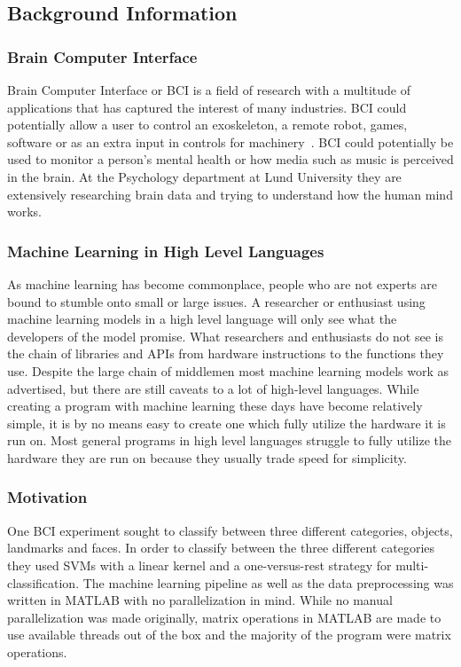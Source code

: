 \documentclass[12pt, a4paper]{article}
\begin{document}
\subsection{Background Information}

\subsubsection{Brain Computer Interface}

Brain Computer Interface or BCI is a field of research with a multitude of applications that has captured the interest of many industries.
BCI could potentially allow a user to control an exoskeleton, a remote robot, games, software or as an extra input in controls for machinery~\cite{10.3389/fnins.2010.00198}.
BCI could potentially be used to monitor a person's mental health or how media such as music is perceived in the brain.
At the Psychology department at Lund University they are extensively researching brain data and trying to understand how the human mind works.

\subsubsection{Machine Learning in High Level Languages}

As machine learning has become commonplace, people who are not experts are bound to stumble onto small or large issues.
A researcher or enthusiast using machine learning models in a high level language will only see what the developers of the model promise.
What researchers and enthusiasts do not see is the chain of libraries and APIs from hardware instructions to the functions they use.
Despite the large chain of middlemen most machine learning models work as advertised, but there are still caveats to a lot of high-level languages. 
While creating a program with machine learning these days have become relatively simple, it is by no means easy to create one which fully utilize the hardware it is run on.
Most general programs in high level languages struggle to fully utilize the hardware they are run on because they usually trade speed for simplicity.

\subsubsection{Motivation}

One BCI experiment sought to classify between three different categories, objects, landmarks and faces.
In order to classify between the three different categories they used SVMs with a linear kernel and a one-versus-rest strategy for multi-classification.
The machine learning pipeline as well as the data preprocessing was written in MATLAB with no parallelization in mind.
While no manual parallelization was made originally, matrix operations in MATLAB are made to use available threads out of the box and the majority of the program were matrix operations.
\end{document}
